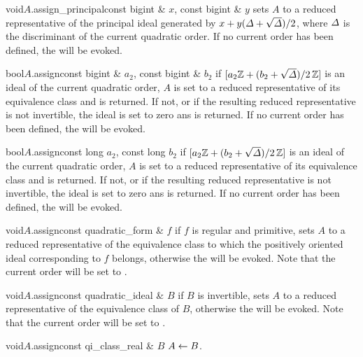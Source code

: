 \begin{fcode}{void}{$A$.assign_principal}{const bigint & $x$, const bigint & $y$}
  sets $A$ to a reduced representative of the principal ideal generated by $x + y (\varDelta +
  \sqrt{\varDelta}) / 2$, where $\varDelta$ is the discriminant of the current quadratic order.  If no current
  order has been defined, the \LEH will be evoked.
\end{fcode}

\begin{fcode}{bool}{$A$.assign}{const bigint & $a_2$, const bigint & $b_2$}
  if $[a_2\mathbb{Z} + (b_2 + \sqrt{\varDelta})/2 \, \mathbb{Z} ]$ is an ideal of the current quadratic order,
  $A$ is set to a reduced representative of its equivalence class and \TRUE is returned.  If
  not, or if the resulting reduced representative is not invertible, the ideal is set to zero
  ans \FALSE is returned.  If no current order has been defined, the \LEH will be evoked.
\end{fcode}

\begin{fcode}{bool}{$A$.assign}{const long $a_2$, const long $b_2$}
  if $[a_2\mathbb{Z} + (b_2 + \sqrt{\varDelta})/2 \, \mathbb{Z} ]$ is an ideal of the current quadratic order,
  $A$ is set to a reduced representative of its equivalence class and \TRUE is returned.  If
  not, or if the resulting reduced representative is not invertible, the ideal is set to zero
  ans \FALSE is returned.  If no current order has been defined, the \LEH will be evoked.
\end{fcode}

\begin{fcode}{void}{$A$.assign}{const quadratic_form & $f$}
  if $f$ is regular and primitive, sets $A$ to a reduced representative of the equivalence class
  to which the positively oriented ideal corresponding to $f$ belongs, otherwise the \LEH will
  be evoked.  Note that the current order will be set to .
\end{fcode}

\begin{fcode}{void}{$A$.assign}{const quadratic_ideal & $B$}
  if $B$ is invertible, sets $A$ to a reduced representative of the equivalence class of $B$,
  otherwise the \LEH will be evoked.  Note that the current order will be set to
  .
\end{fcode}

\begin{fcode}{void}{$A$.assign}{const qi_class_real & $B$}
  $A \leftarrow B$.
\end{fcode}

